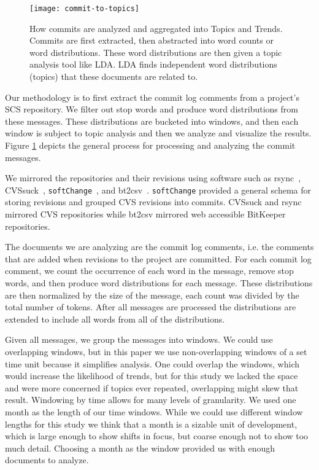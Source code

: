 \documentclass[times, 10pt,twocolumn]{article}
\newcommand{\hla}[1]{{\color{changecolor2} #1 }}
\newcommand{\shrinkit}{\vspace*{-.3em}}
\begin{document}
\shrinkit
{}
\shrinkit


\begin{figure}[t]
  \centering
  \texttt{[image: commit-to-topics]} 
  \caption{How commits are analyzed and aggregated into Topics and Trends. Commits are first extracted, then abstracted into word counts or word distributions. These word distributions are then given a topic analysis tool like LDA. LDA finds independent word distributions (topics) that these documents are related to.}
  \label{fig:commits}
\end{figure}



Our methodology is to first extract the commit log comments from a
project's SCS repository. We filter out stop words and produce word
distributions from these messages. These distributions are bucketed
into windows, and then each window is subject to topic analysis and
then we analyze and visualize the results. Figure \ref{fig:commits}
depicts the general process for processing and analyzing the commit
messages.




\shrinkit
{}
\shrinkit


\hla{
We mirrored the repositories and their revisions using software such
as rsync~\cite{rsync}, CVSsuck~\cite{cvssuck},
\texttt{softChange}~\cite{dmgseke2004}, and bt2csv~\cite{methodology}.
\texttt{softChange} provided a general schema for storing revisions
and grouped CVS revisions into commits. CVSsuck and rsync mirrored CVS
repositories while bt2csv mirrored web accessible BitKeeper
repositories.
}


The documents we are analyzing are the commit log comments, i.e. the
comments that are added when revisions to the project are committed.
For each commit log comment, we count the occurrence of each word in
the message, remove stop words, and then produce word distributions
for each message.  These distributions are then normalized by the size
of the message, each count was divided by the total number of
tokens. After all messages are processed the distributions are
extended to include all words from all of the distributions.

\shrinkit
{}
\shrinkit

Given all messages, we group the messages into windows. We could use
overlapping windows, but in this paper we use non-overlapping windows
of a set time unit because it simplifies analysis.  
One could overlap the
windows, which would increase the likelihood of trends, but for this
study we lacked the space and were more concerned if topics ever
repeated, overlapping might skew that result.
Windowing by time
allows for many levels of granularity.  We used one month as the
length of our time windows. While we could use different window
lengths for this study we think that a month is a sizable unit of
development, which is large enough to show shifts in focus, but coarse
\hla{
enough not to show too much detail. Choosing a month as the window
provided us with enough documents to analyze. 
}
\end{document}
